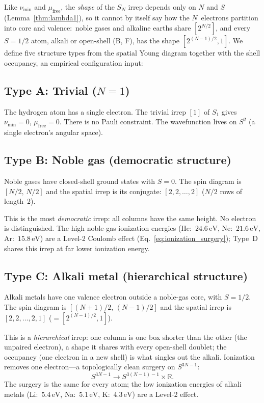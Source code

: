 \documentclass[aps,prl,twocolumn,superscriptaddress,longbibliography]{revtex4-2}
\newcommand{\mufree}{\mu_{\mathrm{free}}}
\newcommand{\eV}{\,\mathrm{eV}}
\begin{document}
Like $\nu_{\min}$ and $\mufree$, the \emph{shape} of the $S_N$ irrep
depends only on $N$ and $S$ (Lemma~\ref{thm:lambda1}), so it cannot by
itself say how the $N$~electrons partition into core and valence:\
noble gases and alkaline earths share $[2^{N/2}]$, and every $S = 1/2$
atom, alkali or open-shell (B, F), has the shape $[2^{(N-1)/2}, 1]$.
We define five structure types from the spatial Young diagram together
with the shell occupancy, an empirical configuration input:

\subsection{Type A: Trivial ($N = 1$)}

The hydrogen atom has a single electron.  The trivial irrep $[1]$ of
$S_1$ gives $\nu_{\min} = 0$, $\mufree = 0$.  There is no
Pauli constraint.  The wavefunction lives on $S^2$ (a single
electron's angular space).

\subsection{Type B: Noble gas (democratic structure)}

Noble gases have closed-shell ground states with $S = 0$.  The spin
diagram is $[N/2,\, N/2]$ and the spatial irrep is its conjugate:
$[2, 2, \ldots, 2]$ ($N/2$ rows of length~2).

This is the most \emph{democratic} irrep: all columns have the same
height.  No electron is distinguished.  The high noble-gas ionization
energies (He:~$24.6\eV$, Ne:~$21.6\eV$, Ar:~$15.8\eV$) are a Level-2
Coulomb effect (Eq.~\ref{eq:ionization_surgery}); Type~D shares this
irrep at far lower ionization energy.

\subsection{Type C: Alkali metal (hierarchical structure)}

Alkali metals have one valence electron outside a noble-gas core, with
$S = 1/2$.  The spin diagram is $[(N+1)/2, \,(N-1)/2]$ and the
spatial irrep is $[2, 2, \ldots, 2, 1]$ ($= [2^{(N-1)/2}, 1]$).

This is a \emph{hierarchical} irrep: one column is one box shorter than
the other (the unpaired electron), a shape it shares with every
open-shell doublet; the occupancy (one electron in a new shell) is what
singles out the alkali.  Ionization removes one electron---a
topologically clean surgery on $S^{3N-1}$:
\begin{equation}
  S^{3N-1} \to S^{3(N-1)-1} \times \mathbb{R}.
  \label{eq:ionization_surgery}
\end{equation}
The surgery is the same for every atom; the low ionization energies
of alkali metals (Li:~$5.4\eV$, Na:~$5.1\eV$, K:~$4.3\eV$) are a
Level-2 effect.
\end{document}
